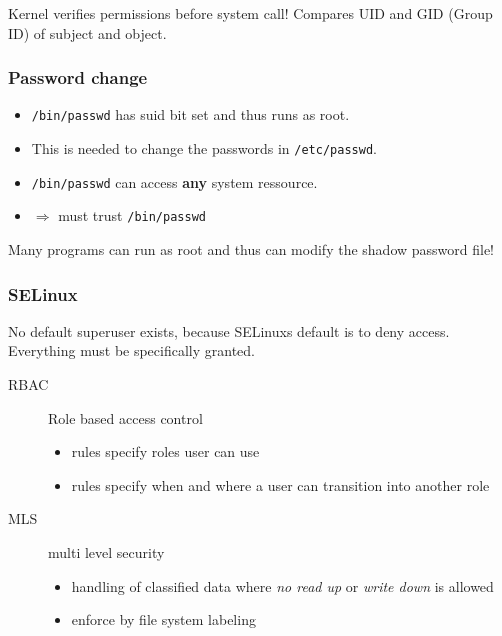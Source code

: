 Kernel verifies permissions before system call! Compares UID and GID (Group ID) of subject and object.

\subsubsection{Password change}
\begin{itemize}
  \item \texttt{/bin/passwd} has suid bit set and thus runs as root.
  \item This is needed to change the passwords in \texttt{/etc/passwd}.
  \item \texttt{/bin/passwd} can access \textbf{any} system ressource.
  \item $\Rightarrow$ must trust \texttt{/bin/passwd}
\end{itemize}
Many programs can run as root and thus can modify the
shadow password file!


\subsubsection{SELinux}
No default superuser exists, because SELinuxs default is to deny access. Everything must be specifically granted.

\begin{description}
    \item[RBAC] Role based access control
        \begin{itemize}
            \item rules specify roles user can use
            \item rules specify when and where a user can transition into another role
        \end{itemize}
    \item[MLS] multi level security
        \begin{itemize}
            \item handling of classified data where \textit{no read up} or \textit{write down} is allowed
            \item enforce by file system labeling
        \end{itemize}
\end{description}

